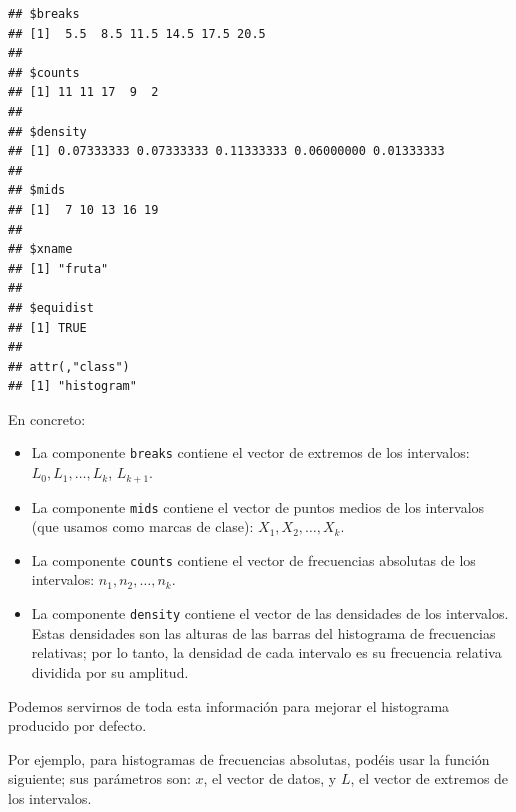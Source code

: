 \documentclass[]{book}
\theoremstyle{definition}
\theoremstyle{definition}
\theoremstyle{definition}
\theoremstyle{remark}
\begin{document}
\begin{verbatim}
## $breaks
## [1]  5.5  8.5 11.5 14.5 17.5 20.5
## 
## $counts
## [1] 11 11 17  9  2
## 
## $density
## [1] 0.07333333 0.07333333 0.11333333 0.06000000 0.01333333
## 
## $mids
## [1]  7 10 13 16 19
## 
## $xname
## [1] "fruta"
## 
## $equidist
## [1] TRUE
## 
## attr(,"class")
## [1] "histogram"
\end{verbatim}

En concreto:

\begin{itemize}
\item
  La componente \texttt{breaks} contiene el vector de extremos de los intervalos: \(L_0,L_1,\ldots,L_k\), \(L_{k+1}\).
\item
  La componente \texttt{mids} contiene el vector de puntos medios de los intervalos (que usamos como marcas de clase): \(X_1,X_2, \ldots,X_k\).
\item
  La componente \texttt{counts} contiene el vector de frecuencias absolutas de los intervalos: \(n_1,n_2,\ldots,n_k\).
\item
  La componente \texttt{density} contiene el vector de las densidades de los intervalos. Estas densidades son las alturas de las barras del histograma de frecuencias relativas; por lo tanto, la densidad de cada intervalo es su frecuencia relativa dividida por su amplitud.
\end{itemize}

Podemos servirnos de toda esta información para mejorar el histograma producido por defecto.

Por ejemplo, para histogramas de frecuencias absolutas, podéis usar la función siguiente; sus parámetros son: \(x\), el vector de datos, y \(L\), el vector de extremos de los intervalos.
\end{document}

